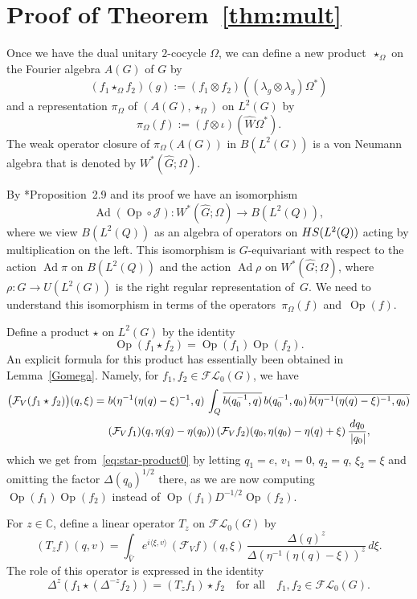 \documentclass[a4paper,11pt,reqno]{amsart}
\numberwithin{equation}{section}
\theoremstyle{remark}
\theoremstyle{definition}
\newcommand\Ad{\operatorname{Ad}}
\newcommand\Op{\operatorname{Op}}
\newcommand\HS{{\rm HS}}
\newcommand{\C}{{\mathbb C}}
\newcommand{\CL}{{\mathcal L}{}}
\newcommand{\CJ}{\mathcal J}
\newcommand{\CF}{\mathcal F}
\begin{document}
\bigskip

\section{Proof of Theorem~\ref{thm:mult}}\label{ap:B}

Once we have the dual unitary $2$-cocycle $\Omega$, we can define a new product~$\star_\Omega$ on the Fourier algebra $A(G)$ of $G$ by
$$
(f_1\star_\Omega f_2)(g):=(f_1\otimes f_2)((\lambda_g\otimes\lambda_g)\Omega^*)
$$
and a representation $\pi_\Omega$ of $(A(G),\star_\Omega)$ on $L^2(G)$ by
$$
\pi_\Omega(f):=(f\otimes\iota)(\hat W\Omega^*).
$$
The weak operator closure of $\pi_\Omega(A(G))$ in $B(L^2(G))$ is a von Neumann algebra that is denoted by $W^*(\hat G;\Omega)$.

By \cite{BGNT3}*{Proposition~2.9} and its proof we have an isomorphism
\begin{equation}\label{eq:iso-Galois}
\Ad (\Op\circ\CJ)\colon W^*(\hat G;\Omega)\to B(L^2(Q)),
\end{equation}
where we view $B(L^2(Q))$ as an algebra of operators on $\HS(L^2(Q))$ acting by multiplication on the left. This isomorphism is $G$-equivariant with respect to the action $\Ad\pi$ on $B(L^2(Q))$ and the action $\Ad\rho$ on $W^*(\hat G;\Omega)$, where $\rho\colon G\to U(L^2(G))$ is the right regular representation of~$G$. We need to understand this isomorphism in terms of the operators~$\pi_\Omega(f)$ and~$\Op(f)$.

Define a product $\star$ on $L^2(G)$ by the identity
$$
\Op(f_1\star f_2)=\Op(f_1)\Op(f_2).
$$
An explicit formula for this product has essentially been obtained in Lemma~\ref{Gomega}. Namely, for $f_1,f_2\in\CF\CL_0(G)$, we have
\begin{align*}
\big(\CF_V(f_1\star f_2)\big)(q,\xi)=\ & b (\eta^{-1}(\eta(q)-\xi)^{-1},q)\,
\int_Q \overline{b (q_0^{-1},q)}\,b (q_0^{-1},q_0)\,\overline{b (\eta^{-1}(\eta(q)-\xi)^{-1},q_0)}\notag \\
&(\CF_Vf_1)(q,\eta(q)-\eta(q_0))\,(\CF_V f_2)(q_0, \eta(q_0)-\eta(q)+\xi)\,\frac{dq_0}{\,|q_0|},
\end{align*}
which we get from~\eqref{eq:star-product0} by letting $q_1=e$, $v_1=0$, $q_2=q$, $\xi_2=\xi$ and omitting the factor $\Delta(q_0)^{1/2}$ there, as we are now computing $\Op(f_1)\Op(f_2)$ instead of $\Op(f_1)D^{-1/2}\Op(f_2)$.

For $z\in\C$, define a linear operator $T_z$ on $\CF\CL_0(G)$ by
$$
(T_zf)(q,v)=\int_{\hat V}e^{i\langle \xi,v\rangle}\,(\CF_V f)(q,\xi)\,\frac{\Delta(q)^z}{\Delta(\eta^{-1}(\eta(q)-\xi))^z}\,d\xi.
$$
The role of this operator is expressed in the identity
\begin{equation}\label{eq:Deltaz}
\Delta^z(f_1\star (\Delta^{-z}f_2))=(T_zf_1)\star f_2\quad\text{for all}\quad f_1,f_2\in \CF\CL_0(G).
\end{equation}
\end{document}
